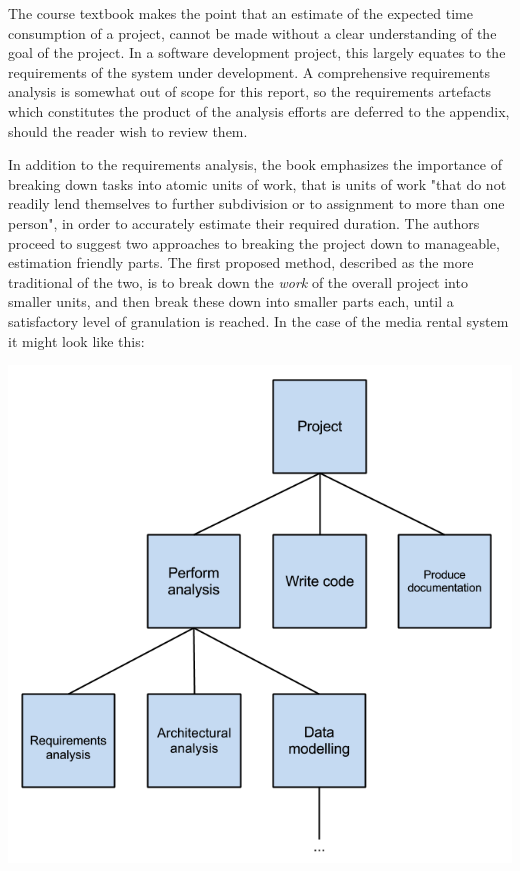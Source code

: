 The course textbook makes the point that an estimate of the expected time consumption of a project, cannot be made without a clear understanding of the goal of the project. In a software development project, this largely equates to the requirements of the system under development. A comprehensive requirements analysis is somewhat out of scope for this report, so the requirements artefacts which constitutes the product of the analysis efforts are deferred to the appendix, should the reader wish to review them.

In addition to the requirements analysis, the book emphasizes the importance of breaking down tasks into atomic units of work, that is units of work "that do not readily lend themselves to further subdivision or to assignment to more than one person", in order to accurately estimate their required duration. The authors proceed to suggest two approaches to breaking the project down to manageable, estimation friendly parts. The first proposed method, described as the more traditional of the two, is to break down the \textit{work} of the overall project into smaller units, and then break these down into smaller parts each, until a satisfactory level of granulation is reached. In the case of the media rental system it might look like this:

\begin{center}
\includegraphics[scale=0.5]{TaskBreakdown.png}
\end{center}

